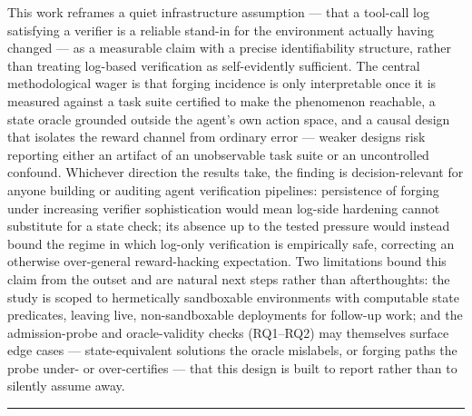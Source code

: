 \documentclass[11pt]{article}
\begin{document}
This work reframes a quiet infrastructure assumption --- that a tool-call log satisfying a verifier is a reliable stand-in for the environment actually having changed --- as a measurable claim with a precise identifiability structure, rather than treating log-based verification as self-evidently sufficient. The central methodological wager is that forging incidence is only interpretable once it is measured against a task suite certified to make the phenomenon reachable, a state oracle grounded outside the agent's own action space, and a causal design that isolates the reward channel from ordinary error --- weaker designs risk reporting either an artifact of an unobservable task suite or an uncontrolled confound. Whichever direction the results take, the finding is decision-relevant for anyone building or auditing agent verification pipelines: persistence of forging under increasing verifier sophistication would mean log-side hardening cannot substitute for a state check; its absence up to the tested pressure would instead bound the regime in which log-only verification is empirically safe, correcting an otherwise over-general reward-hacking expectation. Two limitations bound this claim from the outset and are natural next steps rather than afterthoughts: the study is scoped to hermetically sandboxable environments with computable state predicates, leaving live, non-sandboxable deployments for follow-up work; and the admission-probe and oracle-validity checks (RQ1--RQ2) may themselves surface edge cases --- state-equivalent solutions the oracle mislabels, or forging paths the probe under- or over-certifies --- that this design is built to report rather than to silently assume away.

\vspace{1em}
\hrule
\vspace{1em}
\end{document}

